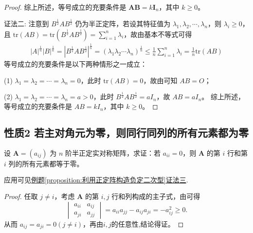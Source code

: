 \documentclass[../../main.tex]{subfiles}%
\begin{document}
\begin{proof}
综上所述，等号成立的充要条件是 \(\boldsymbol{A}\boldsymbol{B}=k\boldsymbol{I}_n\)，其中 \(k\geqslant 0\)。

{\color{blue}证法二:}
注意到 \(B^{\frac{1}{2}}AB^{\frac{1}{2}}\) 仍为半正定阵，若设其特征值为 \(\lambda_1,\lambda_2,\cdots,\lambda_n\)，则 \(\lambda_i \geqslant  0\)，且 \(\mathrm{tr}(AB)=\mathrm{tr}(B^{\frac{1}{2}}AB^{\frac{1}{2}})=\sum_{i = 1}^{n}\lambda_i\)，故由基本不等式可得
\begin{align*}
|A|^{\frac{1}{n}}|B|^{\frac{1}{n}} = |B^{\frac{1}{2}}AB^{\frac{1}{2}}|^{\frac{1}{n}} = (\lambda_1\lambda_2\cdots\lambda_n)^{\frac{1}{n}} \leqslant  \frac{1}{n}\sum_{i = 1}^{n}\lambda_i = \frac{1}{n}\mathrm{tr}(AB)
\end{align*}
等号成立的充要条件是以下两种情形之一成立：

(1) \(\lambda_1 = \lambda_2 = \cdots = \lambda_n = 0\)，此时 \(\mathrm{tr}(AB) = 0\)，故由可知 \(AB = O\)；

(2) \(\lambda_1 = \lambda_2 = \cdots = \lambda_n = a > 0\)，此时 \(B^{\frac{1}{2}}AB^{\frac{1}{2}} = aI_n\)，故 \(AB = aI_n\)。
综上所述，等号成立的充要条件是 \(AB = kI_n\)，其中 \(k \geqslant  0\)。 
\end{proof}

\subsection{性质2 若主对角元为零，则同行同列的所有元素都为零}

\begin{proposition}\label{proposition:若主对角元为零，则同行同列的所有元素都为零}
设 \(\boldsymbol{A}=(a_{ij})\) 为 \(n\) 阶半正定实对称矩阵，求证：若 \(a_{ii}=0\)，则 \(\boldsymbol{A}\) 的第 \(i\) 行和第 \(i\) 列的所有元素都等于零。
\end{proposition}
\begin{remark}
应用可见\hyperref[proposition:利用正定阵构造负定二次型]{例题\ref{proposition:利用正定阵构造负定二次型}证法三}.
\end{remark}
\begin{proof}
任取 \(j\neq i\)，考虑 \(\boldsymbol{A}\) 的第 \(i,j\) 行和列构成的主子式，由可得
\[
\begin{vmatrix}
a_{ii}&a_{ij}\\
a_{ji}&a_{jj}
\end{vmatrix}=a_{ii}a_{jj}-a_{ij}a_{ji}=-a_{ij}^2\geqslant 0.
\]
从而 \(a_{ij}=a_{ji}=0(j\neq i)\)，再由$i,j$的任意性,结论得证。
\end{proof}
\end{document}

